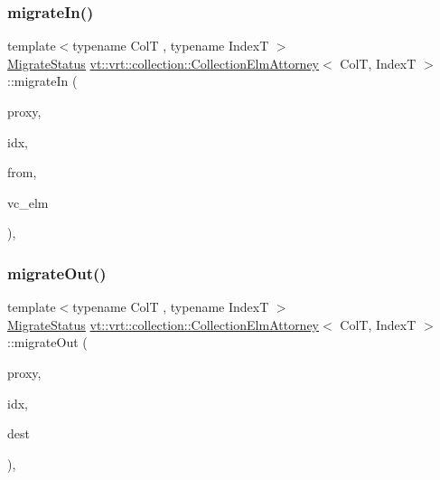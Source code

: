 \subsubsection{\texorpdfstring{migrate\+In()}{migrateIn()}}
{\footnotesize\ttfamily template$<$typename ColT , typename IndexT $>$ \\
\hyperlink{namespacevt_1_1vrt_1_1collection_ad221ad8aea9e586689b4335f5bcd9804}{Migrate\+Status} \hyperlink{structvt_1_1vrt_1_1collection_1_1_collection_elm_attorney}{vt\+::vrt\+::collection\+::\+Collection\+Elm\+Attorney}$<$ ColT, IndexT $>$\+::migrate\+In (\begin{DoxyParamCaption}\item[{\hyperlink{namespacevt_a1b417dd5d684f045bb58a0ede70045ac}{Virtual\+Proxy\+Type} const \&}]{proxy,  }\item[{IndexT const \&}]{idx,  }\item[{\hyperlink{namespacevt_a866da9d0efc19c0a1ce79e9e492f47e2}{Node\+Type} const \&}]{from,  }\item[{\hyperlink{structvt_1_1vrt_1_1collection_1_1_collection_elm_attorney_a36fe2c7f590baec1038c592db59a6315}{Virtual\+Ptr\+Type}}]{vc\+\_\+elm }\end{DoxyParamCaption})\hspace{0.3cm}{\ttfamily [static]}, {\ttfamily [private]}}

\mbox{\label{structvt_1_1vrt_1_1collection_1_1_collection_elm_attorney_a672eb9e913410235692033f5b7ea24b5}} 
\subsubsection{\texorpdfstring{migrate\+Out()}{migrateOut()}}
{\footnotesize\ttfamily template$<$typename ColT , typename IndexT $>$ \\
\hyperlink{namespacevt_1_1vrt_1_1collection_ad221ad8aea9e586689b4335f5bcd9804}{Migrate\+Status} \hyperlink{structvt_1_1vrt_1_1collection_1_1_collection_elm_attorney}{vt\+::vrt\+::collection\+::\+Collection\+Elm\+Attorney}$<$ ColT, IndexT $>$\+::migrate\+Out (\begin{DoxyParamCaption}\item[{\hyperlink{namespacevt_a1b417dd5d684f045bb58a0ede70045ac}{Virtual\+Proxy\+Type} const \&}]{proxy,  }\item[{IndexT const \&}]{idx,  }\item[{\hyperlink{namespacevt_a866da9d0efc19c0a1ce79e9e492f47e2}{Node\+Type} const \&}]{dest }\end{DoxyParamCaption})\hspace{0.3cm}{\ttfamily [static]}, {\ttfamily [private]}}



